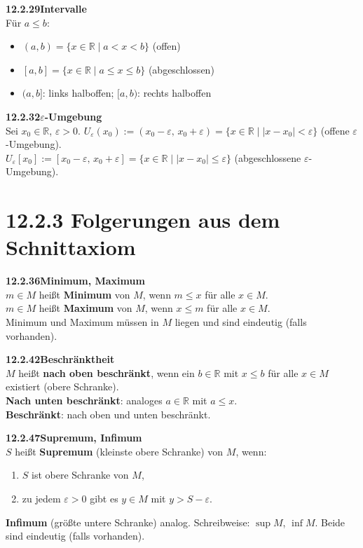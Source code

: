 \documentclass[a4paper,12pt]{article}
\newcommand{\gentry}[3]{%
  \noindent\textbf{#1\quad #2}\nopagebreak\\[0.2em]
  #3\par\smallskip
}
\begin{document}
\gentry{12.2.29}{Intervalle}{%
  Für $a \leq b$:
  \begin{itemize}[topsep=2pt,itemsep=1pt]
    \item $(a,b) = \{x \in \mathbb{R} \mid a < x < b\}$ \quad (offen)
    \item $[a,b] = \{x \in \mathbb{R} \mid a \leq x \leq b\}$ \quad (abgeschlossen)
    \item $(a,b]$: links halboffen; \quad $[a,b)$: rechts halboffen
  \end{itemize}
}

\gentry{12.2.32}{$\varepsilon$-Umgebung}{%
  Sei $x_0 \in \mathbb{R}$, $\varepsilon > 0$.
  $U_\varepsilon(x_0) := (x_0 - \varepsilon,\, x_0 + \varepsilon) = \{x \in \mathbb{R} \mid |x - x_0| < \varepsilon\}$
  \quad (offene $\varepsilon$-Umgebung).\\
  $U_\varepsilon[x_0] := [x_0 - \varepsilon,\, x_0 + \varepsilon] = \{x \in \mathbb{R} \mid |x - x_0| \leq \varepsilon\}$
  \quad (abgeschlossene $\varepsilon$-Umgebung).
}

\section*{12.2.3 \quad Folgerungen aus dem Schnittaxiom}

\gentry{12.2.36}{Minimum, Maximum}{%
  $m \in M$ heißt \textbf{Minimum} von $M$, wenn $m \leq x$ für alle $x \in M$.\\
  $m \in M$ heißt \textbf{Maximum} von $M$, wenn $x \leq m$ für alle $x \in M$.\\
  Minimum und Maximum müssen in $M$ liegen und sind eindeutig (falls vorhanden).
}

\gentry{12.2.42}{Beschränktheit}{%
  $M$ heißt \textbf{nach oben beschränkt}, wenn ein $b \in \mathbb{R}$ mit $x \leq b$
  für alle $x \in M$ existiert (obere Schranke).\\
  \textbf{Nach unten beschränkt}: analoges $a \in \mathbb{R}$ mit $a \leq x$.\\
  \textbf{Beschränkt}: nach oben und unten beschränkt.
}

\gentry{12.2.47}{Supremum, Infimum}{%
  $S$ heißt \textbf{Supremum} (kleinste obere Schranke) von $M$, wenn:
  \begin{enumerate}[label=(\arabic*),topsep=2pt,itemsep=1pt]
    \item $S$ ist obere Schranke von $M$,
    \item zu jedem $\varepsilon > 0$ gibt es $y \in M$ mit $y > S - \varepsilon$.
  \end{enumerate}
  \textbf{Infimum} (größte untere Schranke) analog.
  Schreibweise: $\sup M$, $\inf M$. Beide sind eindeutig (falls vorhanden).
}
\end{document}
